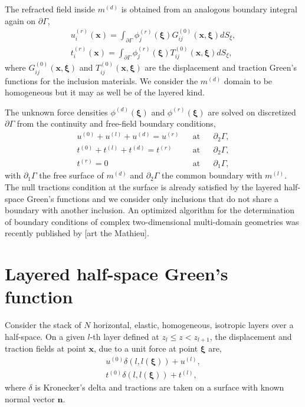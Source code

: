 \documentclass[preprint,5p,times]{elsarticle}
\begin{document}
The refracted field inside $m^{(d)}$ is obtained from an analogous boundary integral again on $\partial \Gamma$,
\begin{equation}
\begin{aligned}
u_i^{(r)}(\boldsymbol{x}) = \int_{\partial \Gamma} \phi^{(r)}_j(\boldsymbol{\xi}) G_{ij}^{(0)} (\boldsymbol{x},\boldsymbol{\xi}) d S_{\xi},\\
t_i^{(r)}(\boldsymbol{x}) = \int_{\partial \Gamma} \phi^{(r)}_j(\boldsymbol{\xi}) T_{ij}^{(0)} (\boldsymbol{x},\boldsymbol{\xi}) d S_{\xi},
\end{aligned}
\end{equation}
where $G_{ij}^{(0)}(\boldsymbol{x},\boldsymbol{\xi})$ and $T_{ij}^{(0)}(\boldsymbol{x},\boldsymbol{\xi})$ are the displacement and traction Green's functions for the inclusion materials. We consider the $m^{(d)}$ domain to be homogeneous but it may as well be of the layered kind.

The unknown force densities $\phi^{(d)}(\boldsymbol{\xi})$ and $\phi^{(r)}(\boldsymbol{\xi})$ are solved on discretized $\partial\Gamma$ from the continuity and free-field boundary conditions,
\begin{equation}
\begin{aligned}
u^{(0)} + u^{(l)} + u^{(d)} =  u^{(r)} && \mathrm{at} && \partial_2 \Gamma, \\
t^{(0)} + t^{(l)} + t^{(d)} =  t^{(r)} && \mathrm{at} && \partial_2 \Gamma, \\
t^{(r)} = 0 && \mathrm{at} && \partial_1 \Gamma,
\end{aligned}
\end{equation}
with $\partial_1 \Gamma$ the free surface of $m^{(d)}$ and $\partial_2 \Gamma$ the common boundary with $m^{(l)}$. The null tractions condition at the surface is already satisfied by the layered half-space Green's functions and we consider only inclusions that do not share a boundary with another inclusion. An optimized algorithm for the determination of boundary conditions of complex two-dimensional multi-domain geometries was recently published by [art the Mathieu].


\section{Layered half-space Green's function}
\label{sec:layeredhalfspaceGreenfunc}
Consider the stack of $N$ horizontal, elastic, homogeneous, isotropic layers over a half-space. On a given $l$-th layer defined at $z_l \le z < z_{l+1}$, the displacement and traction fields at point $\boldsymbol{x}$, due to a unit force at point $\boldsymbol{\xi}$ are,
\begin{equation}
\begin{aligned}
u^{(0)} \delta(l,l(\boldsymbol{\xi})) + u^{(l)}, \\
t^{(0)} \delta(l,l(\boldsymbol{\xi})) + t^{(l)},
\end{aligned}
\label{us}
\end{equation}
where $\delta$ is Kronecker's delta and tractions are taken on a surface with known normal vector $\boldsymbol{n}$.
\end{document}
